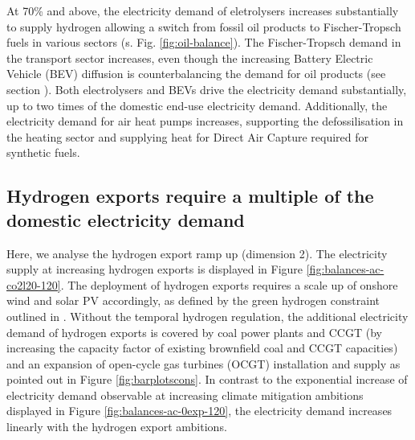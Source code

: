 At 70\% and above, the electricity demand of eletrolysers increases substantially to supply hydrogen allowing a switch from fossil oil products to Fischer-Tropsch fuels in various sectors (s. Fig. \ref{fig:oil-balance}). 
The Fischer-Tropsch demand in the transport sector increases, even though the increasing Battery Electric Vehicle (BEV) diffusion is counterbalancing the demand for oil products (see  section ). 
Both electrolysers and BEVs drive the electricity demand substantially, up to two times of the domestic end-use electricity demand. 
Additionally, the electricity demand for air heat pumps increases, supporting the defossilisation in the heating sector and supplying heat for Direct Air Capture required for synthetic fuels.


\subsection*{Hydrogen exports require a multiple of the domestic electricity demand}
\label{subsec:increase_h2}

Here, we analyse the hydrogen export ramp up (dimension 2). The electricity supply at increasing hydrogen exports is displayed in Figure \ref{fig:balances-ac-co2l20-120}. The deployment of hydrogen exports requires a scale up of onshore wind and solar PV accordingly, as defined by the green hydrogen constraint outlined in .
Without the temporal hydrogen regulation, the additional electricity demand of hydrogen exports is covered by coal power plants and CCGT (by increasing the capacity factor of existing brownfield coal and CCGT capacities) and an expansion of open-cycle gas turbines (OCGT) installation and supply as pointed out in Figure \ref{fig:barplotscons}.
In contrast to the exponential increase of electricity demand observable at increasing climate mitigation ambitions displayed in Figure \ref{fig:balances-ac-0exp-120}, the electricity demand increases linearly with the hydrogen export ambitions.


